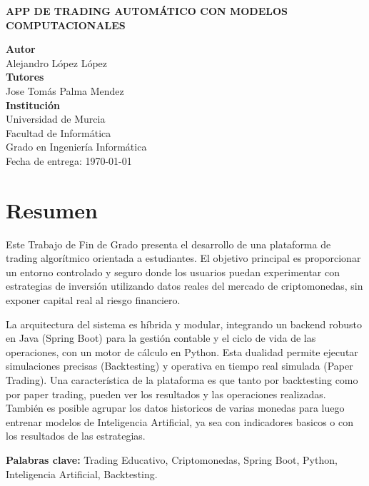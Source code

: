 \documentclass[12pt, letterpaper]{article}
\begin{document}
\begin{titlepage}
    \centering
    \vspace*{1cm}
    {\large \textbf{APP DE TRADING AUTOMÁTICO CON MODELOS COMPUTACIONALES}\par}
    \vspace{2cm}
    \textbf{Autor}\\
    Alejandro López López\\
    \vspace{1.5cm}
    \textbf{Tutores}\\
    Jose Tomás Palma Mendez\\
    \vspace{1.5cm}
    \textbf{Institución}\\
    Universidad de Murcia\\
    Facultad de Informática\\
    Grado en Ingeniería Informática\\
    \vfill
    Fecha de entrega: \today
\end{titlepage}

\newpage
\section*{Resumen}
Este Trabajo de Fin de Grado presenta el desarrollo de una plataforma de trading algorítmico orientada a estudiantes. El objetivo principal es proporcionar un entorno controlado y seguro donde los usuarios puedan experimentar con estrategias de inversión utilizando datos reales del mercado de criptomonedas, sin exponer capital real al riesgo financiero.

La arquitectura del sistema es híbrida y modular, integrando un backend robusto en Java (Spring Boot) para la gestión contable y el ciclo de vida de las operaciones, con un motor de cálculo en Python. Esta dualidad permite ejecutar simulaciones precisas (Backtesting) y operativa en tiempo real simulada (Paper Trading). Una característica de la plataforma es que tanto por backtesting como por paper trading, pueden ver los resultados y las operaciones realizadas. También es posible agrupar los datos historicos de varias monedas para luego entrenar modelos de Inteligencia Artificial, ya sea con indicadores basicos o con los resultados de las estrategias.

\vspace{0.5cm}
\noindent \textbf{Palabras clave:} Trading Educativo, Criptomonedas, Spring Boot, Python, Inteligencia Artificial, Backtesting.
\end{document}
